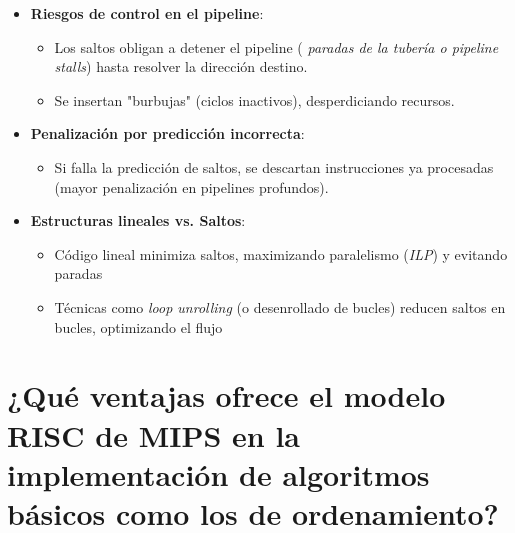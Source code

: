 \documentclass{article}
\begin{document}
\begin{itemize}
\begin{itemize}[label=--]
\begin{itemize}
  \item \textbf{Riesgos de control en el pipeline}:
    \begin{itemize}
      \item Los saltos obligan a detener el pipeline (\textit{ paradas de la tubería o pipeline stalls}) hasta resolver la dirección destino.
      \item Se insertan "burbujas" (ciclos inactivos), desperdiciando recursos.
    \end{itemize}
  \item \textbf{Penalización por predicción incorrecta}:
    \begin{itemize}
      \item Si falla la predicción de saltos, se descartan instrucciones ya procesadas (mayor penalización en pipelines profundos).
    \end{itemize}
  \item \textbf{Estructuras lineales vs. Saltos}:
    \begin{itemize}
      \item Código lineal minimiza saltos, maximizando paralelismo (\textit{ILP}) y evitando paradas
      \item Técnicas como \textit{loop unrolling} (o desenrollado de bucles) reducen saltos en bucles, optimizando el flujo
    \end{itemize}
\end{itemize}

\section{¿Qué ventajas ofrece el modelo RISC de MIPS en la implementación de algoritmos 
básicos como los de ordenamiento? }


\end{itemize}
\end{itemize}
\end{document}
